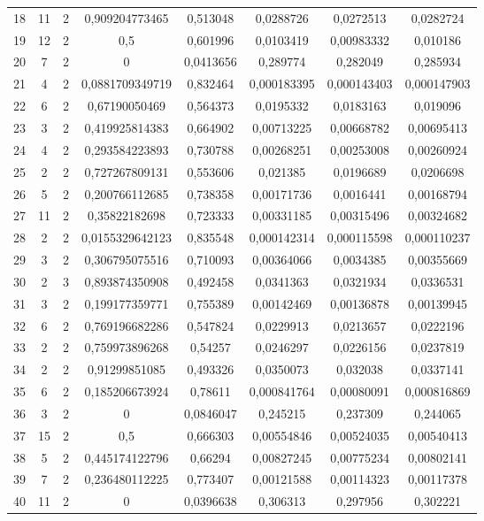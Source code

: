 \begin{longtable}{|c|c|c|c|c|c|c|c|}
18 & 11 & 2 & 0,909204773465 & 0,513048 & 0,0288726 & 0,0272513 & 0,0282724 \\
19 & 12 & 2 & 0,5 & 0,601996 & 0,0103419 & 0,00983332 & 0,010186 \\
20 & 7 & 2 & 0 & 0,0413656 & 0,289774 & 0,282049 & 0,285934 \\
21 & 4 & 2 & 0,0881709349719 & 0,832464 & 0,000183395 & 0,000143403 & 0,000147903 \\
22 & 6 & 2 & 0,67190050469 & 0,564373 & 0,0195332 & 0,0183163 & 0,019096 \\
23 & 3 & 2 & 0,419925814383 & 0,664902 & 0,00713225 & 0,00668782 & 0,00695413 \\
24 & 4 & 2 & 0,293584223893 & 0,730788 & 0,00268251 & 0,00253008 & 0,00260924 \\
25 & 2 & 2 & 0,727267809131 & 0,553606 & 0,021385 & 0,0196689 & 0,0206698 \\
26 & 5 & 2 & 0,200766112685 & 0,738358 & 0,00171736 & 0,0016441 & 0,00168794 \\
27 & 11 & 2 & 0,35822182698 & 0,723333 & 0,00331185 & 0,00315496 & 0,00324682 \\
28 & 2 & 2 & 0,0155329642123 & 0,835548 & 0,000142314 & 0,000115598 & 0,000110237 \\
29 & 3 & 2 & 0,306795075516 & 0,710093 & 0,00364066 & 0,0034385 & 0,00355669 \\
30 & 2 & 3 & 0,893874350908 & 0,492458 & 0,0341363 & 0,0321934 & 0,0336531 \\
31 & 3 & 2 & 0,199177359771 & 0,755389 & 0,00142469 & 0,00136878 & 0,00139945 \\
32 & 6 & 2 & 0,769196682286 & 0,547824 & 0,0229913 & 0,0213657 & 0,0222196 \\
33 & 2 & 2 & 0,759973896268 & 0,54257 & 0,0246297 & 0,0226156 & 0,0237819 \\
34 & 2 & 2 & 0,91299851085 & 0,493326 & 0,0350073 & 0,032038 & 0,0337141 \\
35 & 6 & 2 & 0,185206673924 & 0,78611 & 0,000841764 & 0,00080091 & 0,000816869 \\
36 & 3 & 2 & 0 & 0,0846047 & 0,245215 & 0,237309 & 0,244065 \\
37 & 15 & 2 & 0,5 & 0,666303 & 0,00554846 & 0,00524035 & 0,00540413 \\
38 & 5 & 2 & 0,445174122796 & 0,66294 & 0,00827245 & 0,00775234 & 0,00802141 \\
39 & 7 & 2 & 0,236480112225 & 0,773407 & 0,00121588 & 0,00114323 & 0,00117378 \\
40 & 11 & 2 & 0 & 0,0396638 & 0,306313 & 0,297956 & 0,302221 \\

\end{longtable}
